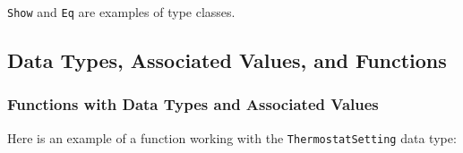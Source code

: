 \begin{Shaded}
\begin{Highlighting}[]
 \OperatorTok{\textless{}}\OperatorTok{\textgreater{}} 
    \OtherTok{=} \OperatorTok{\textless{}}\OperatorTok{\textgreater{}} \OperatorTok{\textless{}}\OperatorTok{\textgreater{}} \OperatorTok{\textless{}}\OperatorTok{\textgreater{}}\OperatorTok{\textless{}}\OperatorTok{\textgreater{}}
    \OperatorTok{|} \OperatorTok{\textless{}}\OperatorTok{\textgreater{}} \OperatorTok{\textless{}}\OperatorTok{\textgreater{}} \OperatorTok{\textless{}}\OperatorTok{\textgreater{}}\OperatorTok{\textless{}}\OperatorTok{\textgreater{}}
    \OperatorTok{|} \OperatorTok{\textless{}}\OperatorTok{\textgreater{}} \OperatorTok{\textless{}}\OperatorTok{\textgreater{}} \OperatorTok{\textless{}}\OperatorTok{\textgreater{}}\OperatorTok{\textless{}}\OperatorTok{\textgreater{}}
    \NormalTok{ (}\OperatorTok{\textless{}}\OperatorTok{\textgreater{}}\NormalTok{, }\OperatorTok{\textless{}}\OperatorTok{\textgreater{}}
\end{Highlighting}
\end{Shaded}

\texttt{Show} and \texttt{Eq} are examples of type classes.

\hypertarget{data-types-associated-values-and-functions}{%
\subsection{Data Types, Associated Values, and
Functions}\label{data-types-associated-values-and-functions}}

\hypertarget{functions-with-data-types-and-associated-values}{%
\subsubsection{Functions with Data Types and Associated
Values}\label{functions-with-data-types-and-associated-values}}

Here is an example of a function working with the
\texttt{ThermostatSetting} data type:

